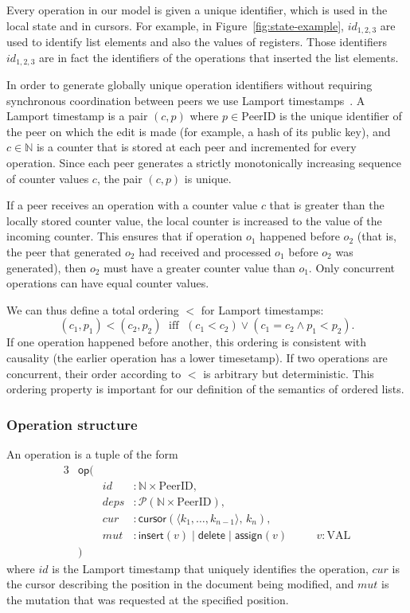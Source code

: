 \documentclass[10pt,journal,compsoc]{IEEEtran}
\begin{document}
Every operation in our model is given a unique identifier, which is used in the local state and in cursors. For example, in Figure~\ref{fig:state-example}, $\mathit{id}_{1,2,3}$ are used to identify list elements and also the values of registers. Those identifiers $\mathit{id}_{1,2,3}$ are in fact the identifiers of the operations that inserted the list elements.

In order to generate globally unique operation identifiers without requiring synchronous coordination between peers we use Lamport timestamps~\cite{Lamport:1978jq}. A Lamport timestamp is a pair $(c, p)$ where $p \in \mathrm{PeerID}$ is the unique identifier of the peer on which the edit is made (for example, a hash of its public key), and $c \in \mathbb{N}$ is a counter that is stored at each peer and incremented for every operation. Since each peer generates a strictly monotonically increasing sequence of counter values $c$, the pair $(c, p)$ is unique.

If a peer receives an operation with a counter value $c$ that is greater than the locally stored counter value, the local counter is increased to the value of the incoming counter. This ensures that if operation $o_1$ happened before $o_2$ (that is, the peer that generated $o_2$ had received and processed $o_1$ before $o_2$ was generated), then $o_2$ must have a greater counter value than $o_1$. Only concurrent operations can have equal counter values.

We can thus define a total ordering $<$ for Lamport timestamps:
\[ (c_1, p_1) < (c_2, p_2) \;\text{ iff }\; (c_1 < c_2) \vee (c_1 = c_2 \wedge p_1 < p_2). \]
If one operation happened before another, this ordering is consistent with causality (the earlier operation has a lower timesetamp). If two operations are concurrent, their order according to $<$ is arbitrary but deterministic. This ordering property is important for our definition of the semantics of ordered lists.

\subsubsection{Operation structure}

An operation is a tuple of the form
\begin{alignat*}{3}
& \mathsf{op}( \\
&& \mathit{id} &: \mathbb{N} \times \mathrm{PeerID}, \\
&& \mathit{deps} &: \mathcal{P}(\mathbb{N} \times \mathrm{PeerID}), \\
&& \mathit{cur} &: \mathsf{cursor}(\langle k_1, \dots, k_{n-1} \rangle,\, k_n), \\
&& \mathit{mut} &: \mathsf{insert}(v) \mid \mathsf{delete} \mid \mathsf{assign}(v) && \quad v: \mathrm{VAL} \\
& )
\end{alignat*}
where $\mathit{id}$ is the Lamport timestamp that uniquely identifies the operation, $\mathit{cur}$ is the cursor describing the position in the document being modified, and $\mathit{mut}$ is the mutation that was requested at the specified position.
\end{document}
